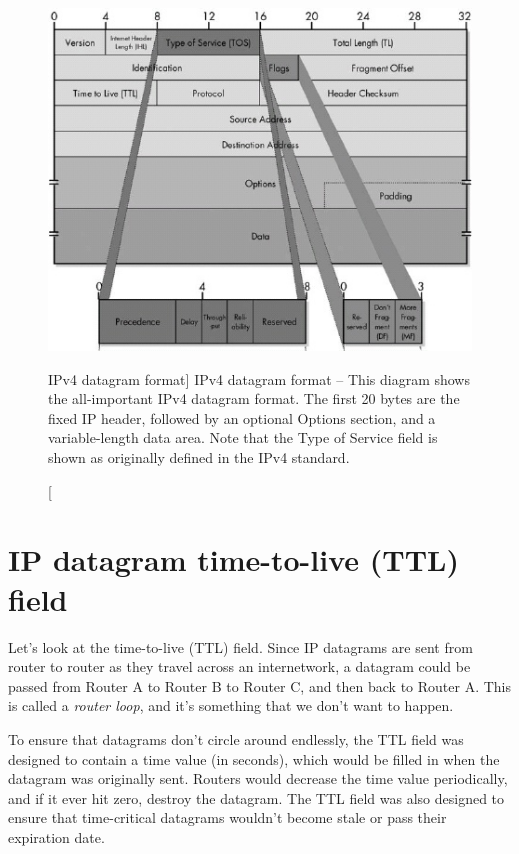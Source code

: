 \begin{figure}
   \centering
   \includegraphics[width=.7\textwidth]{images/ipv4-datagram-format.jpg}
   \caption
      [IPv4 datagram format]
      {IPv4 datagram format -- This diagram shows the all-important IPv4 datagram format.
      The first 20 bytes are the fixed IP header, followed by an optional Options section, and a variable-length data area.
      Note that the Type of Service field is shown as originally defined in the IPv4 standard.}
   \label{fig:ipv4-datagram-format}
\end{figure}



\section{IP datagram time-to-live (TTL) field}

Let's look at the time-to-live (TTL) field.
Since IP datagrams are sent from router to router as they travel across an internetwork, a datagram could be passed from Router A to Router B to Router C, and then back to Router A.
This is called a \emph{router loop}, and it's something that we don't want to happen.

To ensure that datagrams don't circle around endlessly, the TTL
field was
designed to contain a time value (in seconds), which would be filled in
when the datagram was originally sent. Routers would decrease the time
value periodically, and if it ever hit zero, destroy the datagram. The
TTL field
was also designed to ensure that time-critical datagrams wouldn't become
stale or pass their expiration date.

